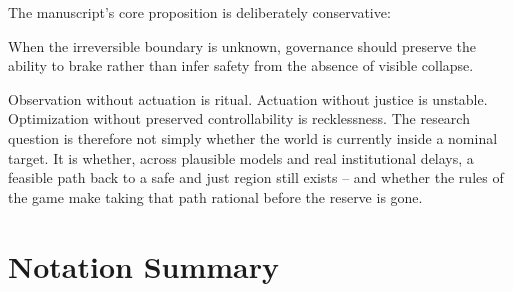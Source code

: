 \documentclass[11pt,a4paper]{article}
\numberwithin{equation}{section}
\theoremstyle{definition}
\theoremstyle{plain}
\theoremstyle{remark}
\begin{document}
The manuscript's core proposition is deliberately conservative:
\begin{corebox}
When the irreversible boundary is unknown, governance should preserve the ability to brake rather than infer safety from the absence of visible collapse.
\end{corebox}

Observation without actuation is ritual. Actuation without justice is unstable. Optimization without preserved controllability is recklessness. The research question is therefore not simply whether the world is currently inside a nominal target. It is whether, across plausible models and real institutional delays, a feasible path back to a safe and just region still exists -- and whether the rules of the game make taking that path rational before the reserve is gone.

\appendix
\section{Notation Summary}
\end{document}
